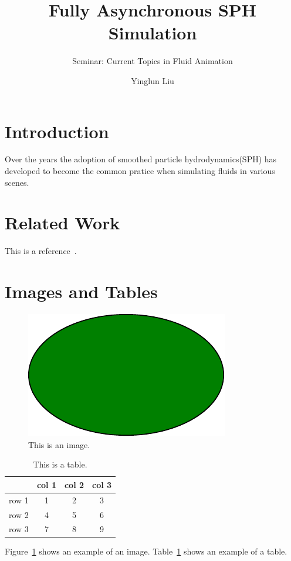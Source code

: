 \documentclass[
	11pt, 
	DIV10,
	ngerman,
	a4paper, 
	oneside, 
	headings=normal, 
	captions=tableheading,
	final, 
	numbers=noenddot
]{scrartcl}
\title{Fully Asynchronous SPH Simulation}
\subtitle{\vspace{0.5cm}Seminar: Current Topics in Fluid Animation}
\author{Yinglun Liu}
\begin{document}
\maketitle


\section{Introduction}

\Paragraph{}

Over the years the adoption of smoothed particle hydrodynamics(SPH) has developed to become the common pratice when simulating fluids in various scenes.

\section{Related Work}

This is a reference~\cite{Foley:1990}.

\section{Images and Tables}

\begin{figure}[tb]
	\centering
	\includegraphics[width=0.5\linewidth]{images/image} 
	\caption{\label{fig:image} This is an image.
	}
\end{figure}

\begin{table}[tb]
	{
		\centering
		\begin{tabular}{|c|c|c|c|}
			\hline
			& col 1 & col 2 & col 3   \\
			\hline	
			row 1  & 1 & 2 & 3 \\
			row 2  & 4 & 5 & 6 \\
			row 3  & 7 & 8 & 9 \\
			\hline
		\end{tabular}
		\caption{\label{tab:example} This is a table.}
	}
\end{table}


Figure~\ref{fig:image} shows an example of an image.
Table~\ref{tab:example} shows an example of a table.




\end{document}
